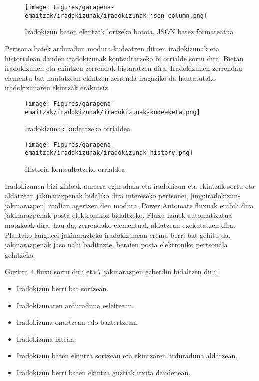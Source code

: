 \begin{figure}[H]
\centering
\texttt{[image: Figures/garapena-emaitzak/iradokizunak/iradokizunak-json-column.png]}
\caption{Iradokizun baten ekintzak lortzeko botoia, JSON batez formateatua}
\label{img:json-formatting}
\end{figure}

Pertsona batek arduradun modura kudeatzen dituen iradokizunak eta historialean dauden iradokizunak kontsultatzeko bi orrialde sortu dira. Bietan iradokizunen eta ekintzen zerrendak bistaratzen dira. Iradokizunen zerrendan elementu bat hautatzean ekintzen zerrenda iragaziko da hautatutako iradokizunaren ekintzak erakutsiz. 

\begin{figure}[H]
\centering
\texttt{[image: Figures/garapena-emaitzak/iradokizunak/iradokizunak-kudeaketa.png]}
\caption{Iradokizunak kudeatzeko orrialdea}
\label{iradokizunak-kudeaketa}
\end{figure}

\begin{figure}[H]
\centering
\texttt{[image: Figures/garapena-emaitzak/iradokizunak/iradokizunak-history.png]}
\caption{Historia kontsultatzeko orrialdea}
\label{iradokizunak-historia}
\end{figure}

Iradokizunen bizi-zikloak aurrera egin ahala eta iradokizun eta ekintzak sortu eta aldatzean jakinarazpenak bidaliko dira intereseko pertsonei, \ref{img:iradokizun-jakinarazpen} irudian agertzen den modura.
Power Automate fluxuak erabili dira jakinarazpenak posta elektronikoz bidaltzeko.
Fluxu hauek automatizatua motakoak dira, hau da, zerrendako elementuak aldatzean exekutatzen dira.
Plantako langileei jakinarazteko iradokizunean eremu berri bat gehitu da, jakinarazpenak jaso nahi badituzte, beraien posta elektroniko pertsonala gehitzeko. 

Guztira 4 fluxu sortu dira eta 7 jakinarazpen ezberdin bidaltzen dira:
\begin{itemize}
  \item Iradokizun berri bat sortzean.
  \item Iradokizunaren arduraduna esleitzean.
  \item Iradokizuna onartzean edo baztertzean. 
  \item Iradokizuna ixtean.
  \item Iradokizun baten ekintza sortzean eta ekintzaren arduraduna aldatzean.
  \item Iradokizun berri baten ekintza guztiak itxita daudenean.
\end{itemize}

